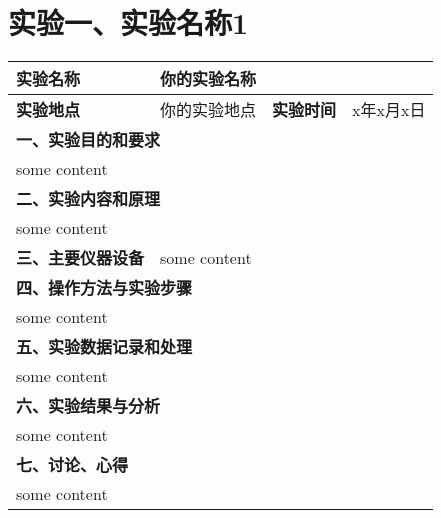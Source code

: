 
\centering
\section{实验一、实验名称1}
\begin{table}[htbp]
\centering
\begin{tabular}{|l|l|l|l|}
\hline
\textbf{实验名称} & \multicolumn{3}{l|}{你的实验名称}\\
\hline
\textbf{实验地点} & 你的实验地点 & \textbf{实验时间} & x年x月x日\\
\hline
\multicolumn{4}{|l|}{\textbf{一、实验目的和要求}} \\
\hline
\multicolumn{4}{|l|}{some content}\\
\hline
\multicolumn{4}{|l|}{\textbf{二、实验内容和原理}} \\
\hline
\multicolumn{4}{|l|}{some content}\\
\hline
\textbf{三、主要仪器设备} & \multicolumn{3}{l|}{some content}\\
\hline
\multicolumn{4}{|l|}{\textbf{四、操作方法与实验步骤}} \\
\hline
\multicolumn{4}{|l|}{some content}\\
\hline
\multicolumn{4}{|l|}{\textbf{五、实验数据记录和处理}}\\
\hline
\multicolumn{4}{|l|}{some content}\\
\hline
\multicolumn{4}{|l|}{\textbf{六、实验结果与分析}}\\
\hline
\multicolumn{4}{|l|}{some content}\\
\hline
\multicolumn{4}{|l|}{\textbf{七、讨论、心得}}\\
\hline
\multicolumn{4}{|l|}{some content}\\
\hline
\end{tabular}
\end{table}